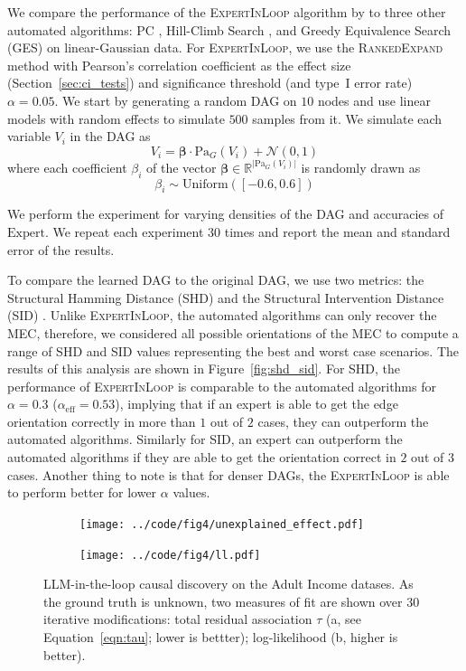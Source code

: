 \documentclass{uai2025} %
\begin{document}
We compare the performance of the \textsc{ExpertInLoop} algorithm by
to three other automated algorithms: PC \citep{Spirtes2001,KalischB07}, 
Hill-Climb Search \citep{scutari2010}, and Greedy Equivalence Search (GES) \citep{Chickering2002}
on linear-Gaussian data. For \textsc{ExpertInLoop}, we
use the \textsc{RankedExpand} method with Pearson's correlation coefficient as
the effect size (Section~\ref{sec:ci_tests}) and significance threshold
(and type~I error rate) $\alpha=0.05$. We start by generating a random DAG 
on $10$ nodes and use linear models
with random effects to simulate $ 500 $ samples from it. We simulate each
variable $ V_i $ in the DAG as
$$
	V_i = \bm{\beta} \cdot \mathrm{Pa}_G(V_i) + \mathcal{N}(0, 1)
$$
where each coefficient $\beta_i$ of the vector $\bm{\beta} \in \mathbb{R}^{|\mathrm{Pa}_G(V_i)|}$ is randomly drawn as
$$
\beta_i \sim \mathrm{Uniform}([-0.6, 0.6])
$$
 
We perform the experiment for varying densities of the DAG and accuracies of
$\mathrm{Expert}$. We repeat each experiment $ 30 $ times and report the
mean and standard error of the results.

To compare the learned DAG to the original DAG, we use two metrics: the Structural
Hamming Distance (SHD) and the Structural Intervention Distance (SID)
\citep{Peters2015}. Unlike \textsc{ExpertInLoop}, the automated algorithms can
only recover the MEC, therefore, we considered all possible orientations of the
MEC to compute a range of SHD and SID values representing the best and worst
case scenarios. The results of this analysis are shown in
Figure~\ref{fig:shd_sid}. For SHD, the performance of \textsc{ExpertInLoop} is
comparable to the automated algorithms for $ \alpha = 0.3$
($\alpha_{\textrm{eff}} = 0.53 $), implying that if an expert is able to get the
edge orientation correctly in more than $ 1 $ out of $ 2 $ cases, they can
outperform the automated algorithms. Similarly for SID, an expert can outperform 
the automated algorithms if they are able to get the orientation correct in $ 2 $ 
out of $ 3 $ cases. Another thing to note is that for denser DAGs, the 
\textsc{ExpertInLoop} is able to perform better for lower $ \alpha $ values.

\begin{figure}[t!]
	\begin{subfigure}{0.25\textwidth}
		\centering
		\texttt{[image: ../code/fig4/unexplained\_effect.pdf]}
		\caption{}
	\end{subfigure}%
	\begin{subfigure}{0.25\textwidth}
		\centering
		\texttt{[image: ../code/fig4/ll.pdf]}
		\caption{}
	\end{subfigure}
	\caption{LLM-in-the-loop causal discovery on the Adult Income datases. As the ground 
truth is unknown, two measures of fit are shown over 30 iterative modifications: 
total residual association $\tau$ (a, see Equation~\ref{eqn:tau}; lower is bettter); log-likelihood (b, higher is better).
	}
	\label{fig:unexplained_ll}
\end{figure}
\end{document}
